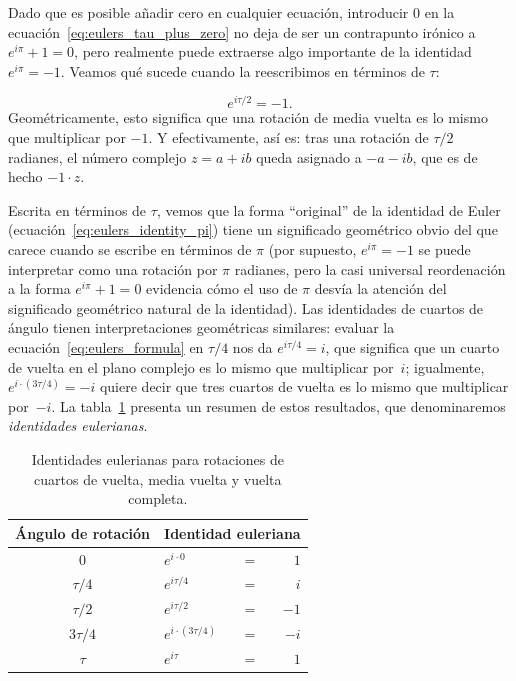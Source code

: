 Dado que es posible añadir cero en cualquier ecuación, introducir $0$ en la ecuación~\eqref{eq:eulers_tau_plus_zero} no deja de ser un contrapunto irónico a $e^{i\pi} + 1 = 0$, pero realmente puede extraerse algo importante de la identidad $e^{i\pi} = -1$. Veamos qué sucede cuando la reescribimos en términos de $\tau$:

\[
e^{i\tau/2} = -1.
\]
Geométricamente, esto significa que una rotación de media vuelta es lo mismo que multiplicar por $-1$. Y efectivamente, así es: tras una rotación de $\tau/2$ radianes, el número complejo $z = a + ib$ queda asignado a $-a - ib$, que es de hecho $-1\cdot z$.

Escrita en términos de $\tau$, vemos que la forma ``original'' de la identidad de Euler (ecuación~\eqref{eq:eulers_identity_pi}) tiene un significado geométrico obvio del que carece cuando se escribe en términos de $\pi$ (por supuesto, $e^{i\pi} = -1$ se puede interpretar como una rotación por $\pi$ radianes, pero la casi universal reordenación a la forma $e^{i\pi} + 1 = 0$ evidencia cómo el uso de $\pi$ desvía la atención del significado geométrico natural de la identidad). Las identidades de cuartos de ángulo tienen interpretaciones geométricas similares: evaluar la ecuación~\eqref{eq:eulers_formula} en $\tau/4$ nos da $e^{i\tau/4} = i$, que significa que un cuarto de vuelta en el plano complejo es lo mismo que multiplicar por~$i$; igualmente, $e^{i\cdot(3\tau/4)} = -i$ quiere decir que tres cuartos de vuelta es lo mismo que multiplicar por~$-i$. La tabla~\ref{table:eulerian_identities} presenta un resumen de estos resultados, que denominaremos \emph{identidades eulerianas}.


\begin{table}
\begin{center}
\begin{tabular}{cllr}
Ángulo de rotación & \multicolumn{3}{c}{Identidad euleriana} \\ \hline
$0$ & $e^{i\cdot0}$ & $ = $ & $1$ \smallskip \\
$\tau/4$ & $e^{i\tau/4}$ & $ = $ & $i$ \smallskip \\
$\tau/2$ & $e^{i\tau/2}$ & $ = $ & $-1$ \smallskip \\
$3\tau/4$ & $e^{i\cdot(3\tau/4)}$ & $ = $ & $-i$ \smallskip \\
$\tau$ & $e^{i\tau}$ & $ = $ & $1$
\end{tabular}
\end{center}
\caption{Identidades eulerianas para rotaciones de cuartos de vuelta, media vuelta y vuelta completa.\label{table:eulerian_identities}}
\end{table}


